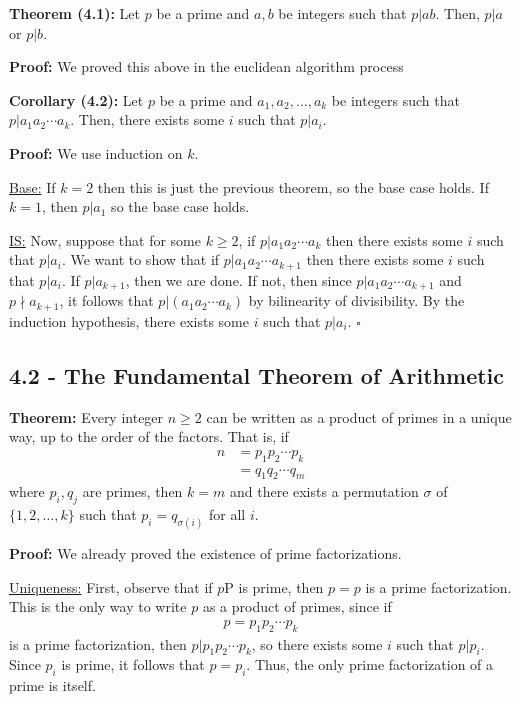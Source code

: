 \documentclass{article}
\newcommand*{\qed}{\hfill$\square$}%
\begin{document}
\textbf{Theorem (4.1):} Let $p$ be a prime and $a,b$ be integers such that $p|ab$. Then, $p|a$ or $p|b$.

\textbf{Proof:} We proved this above in the euclidean algorithm process

\textbf{Corollary (4.2):} Let $p$ be a prime and $a_1,a_2,\ldots, a_k$ be integers such that $p|a_1a_2\cdots a_k$. Then, there exists some $i$ such that $p|a_i$.

\textbf{Proof:} We use induction on $k$.

\underline{Base:} If $k=2$ then this is just the previous theorem, so the base case holds. If $k=1$, then $p|a_1$ so the base case holds.

\underline{IS:} Now, suppose that for some $k\geq 2$, if $p|a_1a_2\cdots a_k$ then there exists some $i$ such that $p|a_i$. We want to show that if $p|a_1a_2\cdots a_{k+1}$ then there exists some $i$ such that $p|a_i$. If $p|a_{k+1}$, then we are done. If not, then since $p|a_1a_2\cdots a_{k+1}$ and $p\nmid a_{k+1}$, it follows that $p|(a_1a_2\cdots a_k)$ by bilinearity of divisibility. By the induction hypothesis, there exists some $i$ such that $p|a_i$. 
\qed

\subsection{4.2 - The Fundamental Theorem of Arithmetic}

\textbf{Theorem:} Every integer $n\geq 2$ can be written as a product of primes in a unique way, up to the order of the factors. That is, if \begin{align*}
    n &= p_1p_2\cdots p_k \\
      &= q_1q_2\cdots q_m
\end{align*}where $p_i,q_j$ are primes, then $k=m$ and there exists a permutation $\sigma$ of $\{1,2,\ldots, k\}$ such that $p_i=q_{\sigma(i)}$ for all $i$.

\textbf{Proof:} We already proved the existence of prime factorizations. 

\underline{Uniqueness:} First, observe that if $p$P is prime, then $p=p$ is a prime factorization. This is the only way to write $p$ as a product of primes, since if \begin{align*}
    p=p_1p_2\cdots p_k
\end{align*}is a prime factorization, then $p|p_1p_2\cdots p_k$, so there exists some $i$ such that $p|p_i$. Since $p_i$ is prime, it follows that $p=p_i$. Thus, the only prime factorization of a prime is itself.
\end{document}
